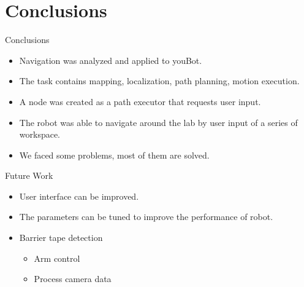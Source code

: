 
\section{Conclusions}
\begin{frame}{Conclusions}
\begin{itemize}
	\item Navigation was analyzed and applied to youBot.    
	\item The task contains mapping, localization, path planning, motion execution.
	\item A node was created as a path executor that requests user input. 
	\item The robot was able to navigate around the lab by user input of a series of workspace.
    \item We faced some problems, most of them are solved.
\end{itemize}
\end{frame}
\begin{frame}{Future Work}
\begin{itemize}
	\item User interface can be improved.
	\item The parameters can be tuned to improve the performance of robot.
    \item Barrier tape detection
    \begin{itemize}
        \item Arm control
        \item Process camera data
    \end{itemize}
\end{itemize}
\end{frame}